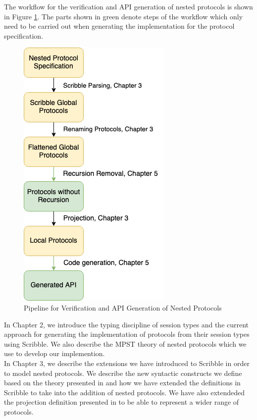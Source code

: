 \documentclass[12pt,twoside]{report}
\begin{document}
The workflow for the verification and API generation of nested protocols is shown in Figure \ref{project-pipeline}. The parts shown in green denote steps of the workflow which only need to be carried out when generating the implementation for the protocol specification.\\

\begin{figure}
    \centering
    \includegraphics[scale=0.75]{figures/pipeline.png}
    \caption{Pipeline for Verification and API Generation of Nested Protocols}
    \label{project-pipeline}
\end{figure}

In Chapter 2, we introduce the typing discipline of session types and the current approach for generating the implementation of protocols from their session types using Scribble\cite{scribble}. We also describe the MPST theory of nested protocols which we use to develop our implemention.\\

In Chapter 3, we describe the extensions we have introduced to Scribble\cite{featherweight} in order to model nested protocols. We describe the new syntactic constructs we define based on the theory presented in \cite{nestedprotocols} and how we have extended the definitions in Scribble to take into the addition of nested protocols. We have also extendeded the projection definition presented in \cite{nestedprotocols} to be able to represent a wider range of protocols.\\
\end{document}
